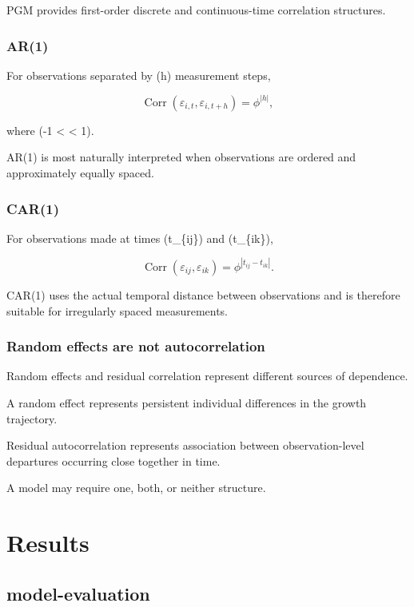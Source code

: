 \documentclass[
  english,
  letterpaper,
  DIV=11,
  numbers=noendperiod]{scrreprt}
\begin{document}
PGM provides first-order discrete and continuous-time correlation
structures.

\section{AR(1)}\label{ar1}

For observations separated by (h) measurement steps,

\[
\operatorname{Corr}
(\varepsilon_{i,t},\varepsilon_{i,t+h})
=
\phi^{|h|},
\]

where (-1 \textless{} \phi \textless{} 1).

AR(1) is most naturally interpreted when observations are ordered and
approximately equally spaced.

\section{CAR(1)}\label{car1}

For observations made at times (t\_\{ij\}) and (t\_\{ik\}),

\[
\operatorname{Corr}
(\varepsilon_{ij},\varepsilon_{ik})
=
\phi^{|t_{ij}-t_{ik}|}.
\]

CAR(1) uses the actual temporal distance between observations and is
therefore suitable for irregularly spaced measurements.

\section{Random effects are not
autocorrelation}\label{random-effects-are-not-autocorrelation}

Random effects and residual correlation represent different sources of
dependence.

A random effect represents persistent individual differences in the
growth trajectory.

Residual autocorrelation represents association between
observation-level departures occurring close together in time.

A model may require one, both, or neither structure.

\part{Results}

\chapter{model-evaluation}\label{model-evaluation}
\end{document}
